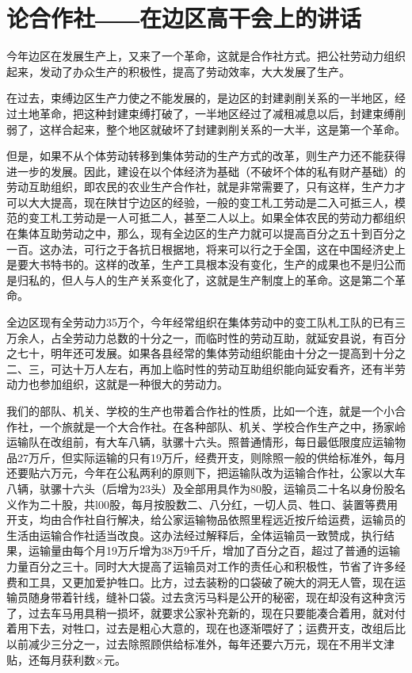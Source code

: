 \section[论合作社――在边区高干会上的讲话（一九四三年十月）]{论合作社――在边区高干会上的讲话}


今年边区在发展生产上，又来了一个革命，这就是合作社方式。把公社劳动力组织起来，发动了办众生产的积极性，提高了劳动效率，大大发展了生产。

在过去，束缚边区生产力使之不能发展的，是边区的封建剥削关系的一半地区，经过土地革命，把这种封建束缚打破了，一半地区经过了减租减息以后，封建束缚削弱了，这样合起来，整个地区就破坏了封建剥削关系的一大半，这是第一个革命。

但是，如果不从个体劳动转移到集体劳动的生产方式的改革，则生产力还不能获得进一步的发展。因此，建设在以个体经济为基础（不破坏个体的私有财产基础）的劳动互助组织，即农民的农业生产合作社，就是非常需要了，只有这样，生产力才可以大大提高，现在陕甘宁边区的经验，一般的变工札工劳动是二入可抵三人，模范的变工札工劳动是一人可抵二人，甚至二人以上。如果全体农民的劳动力都组织在集体互助劳动之中，那么，现有全边区的生产力就可以提高百分之五十到百分之一百。这办法，可行之于各抗日根据地，将来可以行之于全国，这在中国经济史上是要大书特书的。这样的改革，生产工具根本没有变化，生产的成果也不是归公而是归私的，但人与人的生产关系变化了，这就是生产制度上的革命。这是第二个革命。

全边区现有全劳动力35万个，今年经常组织在集体劳动中的变工队札工队的已有三万余人，占全劳动力总数的十分之一，而临时性的劳动互助，就延安县说，有百分之七十，明年还可发展。如果各县经常的集体劳动组织能由十分之一提高到十分之二、三，可达十万人左右，再加上临时性的劳动互助组织能向延安看齐，还有半劳动力也参加组织，这就是一种很大的劳动力。

我们的部队、机关、学校的生产也带着合作社的性质，比如一个连，就是一个小合作社，一个旅就是一个大合作社。在各种部队、机关、学校合作生产之中，扬家岭运输队在改组前，有大车八辆，驮骡十六头。照普通情形，每日最低限度应运输物品27万斤，但实际运输的只有19万斤，经费开支，则除照一般的供给标准外，每月还要贴六万元，今年在公私两利的原则下，把运输队改为运输合作社，公家以大车八辆，驮骡十六头（后增为23头）及全部用具作为80股，运输员二十名以身份股名义作为二十股，共l00股，每月按股数二、八分红，一切人员、牲口、装置等费用开支，均由合作社自行解决，给公家运输物品依照里程远近按斤给运费，运输员的生活由运输合作社适当改良。这办法经过解释后，全体运输员一致赞成，执行结果，运输量由每个月19万斤增为38万9千斤，增加了百分之百，超过了普通的运输力量百分之三十。同时大大提高了运输员对工作的责任心和积极性，节省了许多经费和工具，又更加爱护牲口。比方，过去装粉的口袋破了碗大的洞无人管，现在运输员随身带着针线，缝补口袋。过去贪污马料是公开的秘密，现在却没有这种贪污了，过去车马用具稍一损坏，就要求公家补充新的，现在只要能凑合着用，就对付着用下去，对牲口，过去是粗心大意的，现在也逐渐喂好了；运费开支，改组后比以前减少三分之一，过去除照顾供给标准外，每年还要六万元，现在不用半文津贴，还每月获利数×元。

